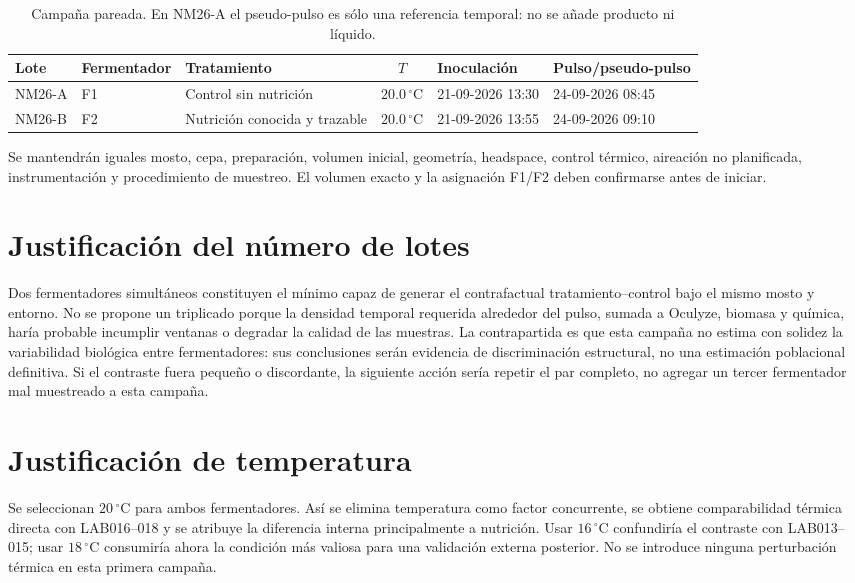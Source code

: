 \documentclass[11pt,a4paper]{article}
\begin{document}
\begin{table}[ht]
\centering
\small
\begin{tabularx}{\textwidth}{@{}l l Y c l l@{}}
\toprule
Lote & Fermentador & Tratamiento & \(T\) & Inoculación & Pulso/pseudo-pulso\\
\midrule
NM26-A & F1 & Control sin nutrición & \(20.0\,^{\circ}\mathrm{C}\) &
21-09-2026 13:30 & 24-09-2026 08:45\\
NM26-B & F2 & Nutrición conocida y trazable & \(20.0\,^{\circ}\mathrm{C}\) &
21-09-2026 13:55 & 24-09-2026 09:10\\
\bottomrule
\end{tabularx}
\caption{Campaña pareada. En NM26-A el pseudo-pulso es sólo una referencia
temporal: no se añade producto ni líquido.}
\end{table}

Se mantendrán iguales mosto, cepa, preparación, volumen inicial, geometría,
headspace, control térmico, aireación no planificada, instrumentación y
procedimiento de muestreo. El volumen exacto y la asignación F1/F2 deben
confirmarse antes de iniciar.

\section{Justificación del número de lotes}

Dos fermentadores simultáneos constituyen el mínimo capaz de generar el
contrafactual tratamiento--control bajo el mismo mosto y entorno. No se propone
un triplicado porque la densidad temporal requerida alrededor del pulso, sumada a
Oculyze, biomasa y química, haría probable incumplir ventanas o degradar la
calidad de las muestras. La contrapartida es que esta campaña no estima con
solidez la variabilidad biológica entre fermentadores: sus conclusiones serán
evidencia de discriminación estructural, no una estimación poblacional definitiva.
Si el contraste fuera pequeño o discordante, la siguiente acción sería repetir
el par completo, no agregar un tercer fermentador mal muestreado a esta campaña.

\section{Justificación de temperatura}

Se seleccionan \(20\,^{\circ}\mathrm{C}\) para ambos fermentadores. Así se elimina
temperatura como factor concurrente, se obtiene comparabilidad térmica directa
con LAB016--018 y se atribuye la diferencia interna principalmente a nutrición.
Usar \(16\,^{\circ}\mathrm{C}\) confundiría el contraste con LAB013--015; usar
\(18\,^{\circ}\mathrm{C}\) consumiría ahora la condición más valiosa para una
validación externa posterior. No se introduce ninguna perturbación térmica en
esta primera campaña.
\end{document}
